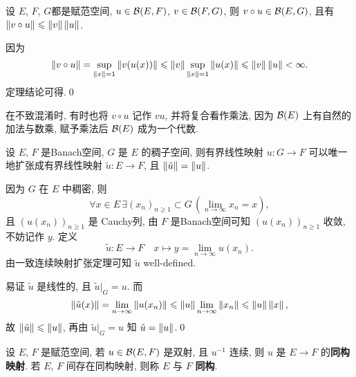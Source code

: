     \begin{Theorem}
         设 $ E $, $ F $, $ G $都是赋范空间,  $ u\in\mathcal{B}(E, F) $, $ v\in\mathcal{B}(F, G) $, 则 $ v\circ u\in\mathcal{B}(E, G) $, 且有 $ \left\| v\circ u \right\|\leqslant\left\| v \right\|\left\| u \right\| $.
    \end{Theorem}
    \begin{Proof}
        因为
        \[
            \left\| v\circ u \right\|=\sup_{\left\| x \right\|=1}\left\| v(u(x)) \right\|\leqslant\left\| v \right\|\sup_{\left\| x \right\|=1}\left\| u(x) \right\|\leqslant\left\| v \right\|\left\| u \right\|<\infty.
        \]
        定理结论可得.\qed
    \end{Proof}

    \begin{Remark}
        在不致混淆时, 有时也将 $ v\circ u $ 记作 $ vu $, 并将复合看作乘法, 因为 $ \mathcal{B}(E) $ 上有自然的加法与数乘, 赋予乘法后 $ \mathcal{B}(E) $ 成为一个代数.
    \end{Remark}

    \begin{Theorem}
        设 $ E $, $ F $ 是Banach空间,  $ G $ 是 $ E $ 的稠子空间, 则有界线性映射 $ u: G\to F $ 可以唯一地扩张成有界线性映射 $ \tilde{u}:E\to F $, 且 $ \left\| \tilde{u} \right\|=\left\| u \right\| $.
   \end{Theorem}
   \begin{Proof}
        因为 $ G $ 在 $ E $ 中稠密, 则
        \[
            \forall x\in E\,\exists(x_{n})_{n\geqslant1}\subset G\,(\lim_{n\to\infty}x_{n}=x),
        \]
        且 $ (u(x_{n}))_{n\geqslant1} $ 是 Cauchy列, 由 $ F $ 是Banach空间可知 $ (u(x_{n}))_{n\geqslant1} $ 收敛, 不妨记作 $ y $. 定义
        \[
            \tilde{u}: E\to F\quad x\mapsto y=\lim_{n\to\infty}u(x_{n}).
        \]
        由一致连续映射扩张定理可知 $ \tilde{u} $ well-defined.

        易证 $ \tilde{u} $ 是线性的, 且 $ \tilde{u}|_{G}=u $. 而
        \[
            \left\| \tilde{u}(x) \right\|=\lim_{n\to\infty}\left\| u(x_{n}) \right\|\leqslant\left\| u \right\|\lim_{n\to\infty}\left\| x_{n} \right\|\leqslant\left\| u \right\|\left\| x \right\|,
        \]
        故 $ \left\| \tilde{u} \right\|\leqslant\left\| u \right\| $, 再由 $ \tilde{u}|_{G}=u $ 知 $ \tilde{u}=\left\| u \right\| $.\qed
        
    \end{Proof}

    \begin{Definition}[同构]\label{def:同构}
         设 $ E $, $ F $ 是赋范空间, 若 $ u\in\mathcal{B}(E, F) $ 是双射, 且 $ u^{-1} $ 连续, 则 $ u $ 是 $ E\to F $ 的\textbf{同构映射}. 若 $ E $, $ F $ 间存在同构映射, 则称 $ E $ 与 $ F $ \textbf{同构}.
    \end{Definition}

